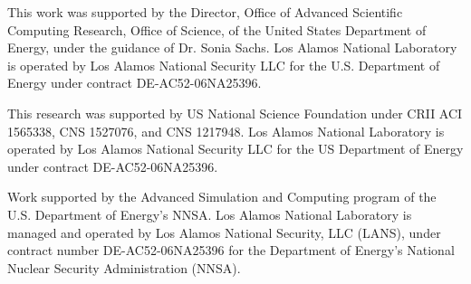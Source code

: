 \documentclass[sigconf]{acmart}
\begin{document}
This work was supported by the Director, Office of Advanced Scientific
Computing Research, Office of Science, of the United States Department
of Energy, under the guidance of Dr. Sonia Sachs. Los Alamos National
Laboratory is operated by Los Alamos National Security LLC for the U.S.
Department of Energy under contract DE-AC52-06NA25396.

This research was supported by US National Science Foundation under CRII
ACI 1565338, CNS 1527076, and CNS 1217948. Los Alamos National
Laboratory is operated by Los Alamos National Security LLC for the US
Department of Energy under contract DE-AC52-06NA25396.

Work supported by the Advanced Simulation and Computing program of the
U.S. Department of Energy's NNSA\@.  Los Alamos National Laboratory is
managed and operated by Los Alamos National Security, LLC (LANS), under
contract number DE-AC52-06NA25396 for the Department of Energy’s
National Nuclear Security Administration (NNSA).



\end{document}
